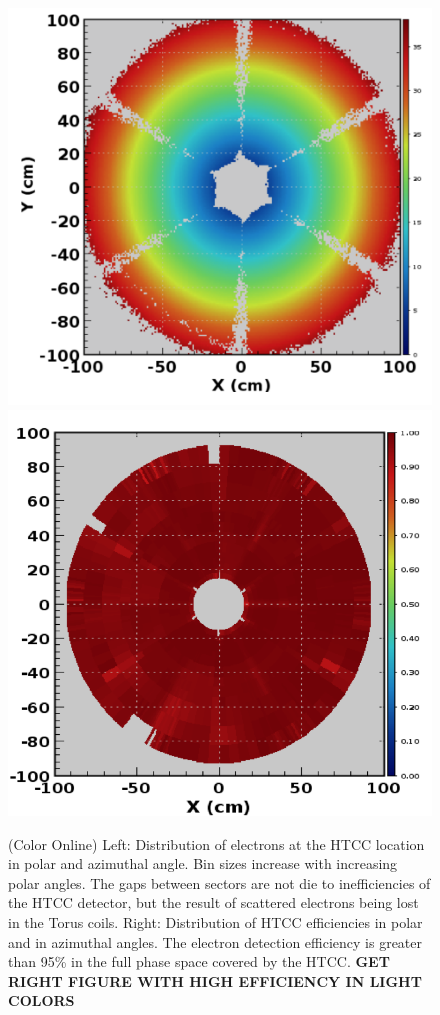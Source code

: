\documentclass[final,3p,twocolumn]{elsarticle}
\begin{document}
\begin{figure}[htbp!]
{\includegraphics[width=1.0\columnwidth]{htcc-dis.png}}
{\includegraphics[width=1.0\columnwidth]{htcc-eff.png}}
\caption{(Color Online) Left: Distribution of electrons at the HTCC location in polar and azimuthal angle. Bin sizes increase with
increasing polar angles. The gaps between sectors are not die to inefficiencies of the HTCC detector, but the result
of scattered electrons being lost in the Torus coils. Right: Distribution of HTCC efficiencies in polar and in azimuthal
angles. The electron detection efficiency is greater than 95\% in the full phase space covered by the HTCC.
{\bf GET RIGHT FIGURE WITH HIGH EFFICIENCY IN LIGHT COLORS}} 
\label{htcc-eff}
\end{figure}
\end{document}
